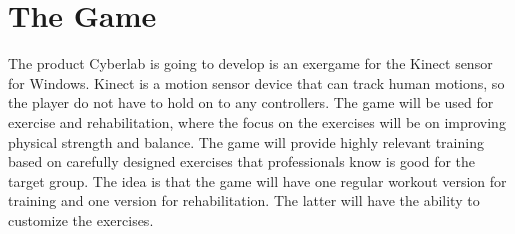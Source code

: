 \section{The Game}
The product Cyberlab is going to develop is an exergame for the Kinect sensor for Windows. Kinect is a motion sensor device that can track human motions, so the player do not have to hold on to any controllers. The game will be used for exercise and rehabilitation, where the focus on the exercises will be on improving physical strength and balance. The game will provide highly relevant training based on carefully designed exercises that professionals know is good for the target group. The idea is that the game will have one regular workout version for training and one version for rehabilitation. The latter will have the ability to customize the exercises. 

